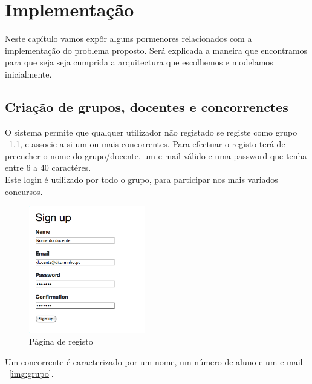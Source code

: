 \chapter{Implementação} \label{chap implem}
\minitoc
Neste capítulo vamos expôr alguns pormenores relacionados com a implementação do problema proposto.
Será explicada a maneira que encontramos para que seja seja cumprida a arquitectura que escolhemos e modelamos inicialmente.

\section{Criação de grupos, docentes e concorrenctes}\label{sec gdc}
O sistema permite que qualquer utilizador não registado se registe como grupo ~\ref{img:signup}, e associe a si um ou mais concorrentes. Para efectuar o registo terá de preencher o nome do grupo/docente, um e-mail válido e uma password que tenha entre 6 a 40 caractéres.\\
Este login é utilizado por todo o grupo, para participar nos mais variados concursos.\\

\begin{figure}[H]
\begin{center}
\includegraphics[width=0.45\textwidth]{Images/signup}
\caption{Página de registo}\label{img:signup}
\end{center}
\end{figure} 

Um concorrente é caracterizado por um nome, um número de aluno e um e-mail ~\ref{img:grupo}.

